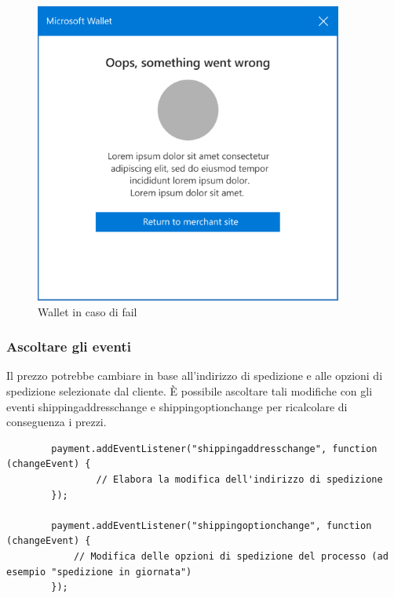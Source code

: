 \documentclass[italian]{article}
\begin{document}
	\begin{figure}[h]
		\centering
		\includegraphics[width=1\linewidth]{wallet3}
		\caption{Wallet in caso di fail}
		\label{fig: Wallet in caso di fail}
	\end{figure}

	\subsubsection{Ascoltare gli eventi}
	Il prezzo potrebbe cambiare in base all'indirizzo di spedizione e alle opzioni di spedizione selezionate dal cliente. È possibile ascoltare tali modifiche con gli eventi shippingaddresschange e shippingoptionchange per ricalcolare di conseguenza i prezzi.
	\begin{lstlisting}
		payment.addEventListener("shippingaddresschange", function (changeEvent) {
			    // Elabora la modifica dell'indirizzo di spedizione
		});
		
		payment.addEventListener("shippingoptionchange", function (changeEvent) {
			// Modifica delle opzioni di spedizione del processo (ad esempio "spedizione in giornata")
		});
	\end{lstlisting}
	
\end{document}
